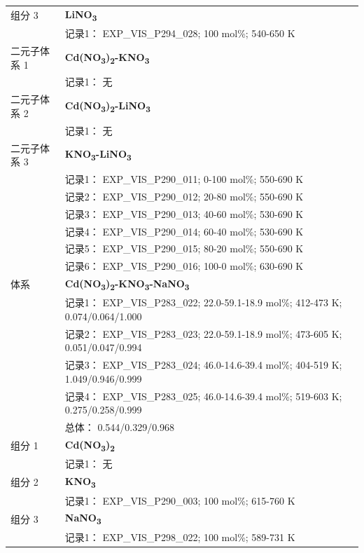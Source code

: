 \documentclass[12pt]{article}
\begin{document}
{\begin{longtable}[]{@{}
  >{\raggedright\arraybackslash}p{}
  >{\raggedright\arraybackslash}p{}@{}}
组分 3  & \textbf{LiNO\textsubscript{3}} \\
 & 记录1： EXP\_VIS\_P294\_028; 100 mol\%; 540-650 K  \\

二元子体系 1 & \textbf{Cd(NO\textsubscript{3})\textsubscript{2}-KNO\textsubscript{3}} \\
 & 记录1： 无 \\
二元子体系 2 & \textbf{Cd(NO\textsubscript{3})\textsubscript{2}-LiNO\textsubscript{3}} \\
 & 记录1： 无 \\
二元子体系 3  & \textbf{KNO\textsubscript{3}-LiNO\textsubscript{3}} \\
 & 记录1： EXP\_VIS\_P290\_011; 0-100 mol\%; 550-690 K \\
 & 记录2： EXP\_VIS\_P290\_012; 20-80 mol\%; 550-690 K \\
 & 记录3： EXP\_VIS\_P290\_013; 40-60 mol\%; 530-690 K \\
 & 记录4： EXP\_VIS\_P290\_014; 60-40 mol\%; 530-690 K \\
 & 记录5： EXP\_VIS\_P290\_015; 80-20 mol\%; 550-690 K \\
 & 记录6： EXP\_VIS\_P290\_016; 100-0 mol\%; 630-690 K  \\

\midrule
体系 & \textbf{Cd(NO\textsubscript{3})\textsubscript{2}-KNO\textsubscript{3}-NaNO\textsubscript{3}} \\
 & 记录1： EXP\_VIS\_P283\_022; 22.0-59.1-18.9 mol\%; 412-473 K; 0.074/0.064/1.000 \\
 & 记录2： EXP\_VIS\_P283\_023; 22.0-59.1-18.9 mol\%; 473-605 K; 0.051/0.047/0.994 \\
 & 记录3： EXP\_VIS\_P283\_024; 46.0-14.6-39.4 mol\%; 404-519 K; 1.049/0.946/0.999 \\
 & 记录4： EXP\_VIS\_P283\_025; 46.0-14.6-39.4 mol\%; 519-603 K; 0.275/0.258/0.999 \\
 & 总体： 0.544/0.329/0.968  \\

组分 1 & \textbf{Cd(NO\textsubscript{3})\textsubscript{2}} \\
 & 记录1： 无 \\
组分 2  & \textbf{KNO\textsubscript{3}} \\
 & 记录1： EXP\_VIS\_P290\_003; 100 mol\%; 615-760 K  \\

组分 3  & \textbf{NaNO\textsubscript{3}} \\
 & 记录1： EXP\_VIS\_P298\_022; 100 mol\%; 589-731 K  \\


\end{longtable}}
\end{document}
